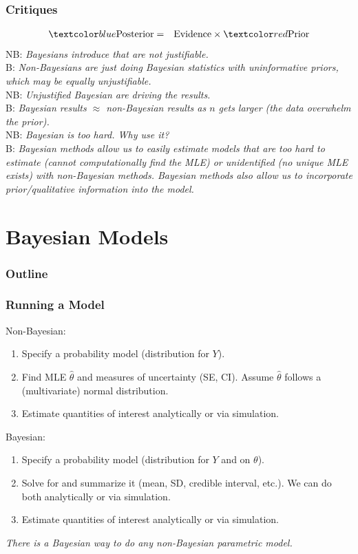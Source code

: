 \documentclass[handout]{beamer}
\begin{document}
\begin{frame}
\frametitle{Critiques}
\pause
\begin{eqnarray*}
\blue{\mathrm{Posterior}} &=& \mathrm{Evidence} \times \red{\mathrm{Prior}}
\end{eqnarray*}
\pause
NB: {\it Bayesians introduce  that are not justifiable.} \\
\pause
\footnotesize B: \emph{Non-Bayesians are just doing Bayesian statistics with uninformative
priors, which may be equally unjustifiable.} \\
\bigskip
\pause
\normalsize
NB: {\it Unjustified Bayesian  are driving the results.} \\
\pause
\footnotesize
B: \emph{Bayesian results $\approx$ non-Bayesian results as $n$ gets larger
(the data overwhelm the prior).} \\
\pause
\bigskip
\normalsize
NB: {\it Bayesian is too hard.  Why use it?} \\
\pause
\footnotesize
B: \emph{Bayesian methods allow us to easily estimate models that are too hard to
estimate (cannot computationally find the MLE) or unidentified (no unique MLE
exists) with non-Bayesian methods. \pause Bayesian methods also allow us to
incorporate prior/qualitative information into the model.}  
\normalsize
\end{frame}

\section{Bayesian Models}

\begin{frame}
\frametitle{Outline}
\tableofcontents[currentsection]
\end{frame}

\begin{frame}
\frametitle{Running a Model}
\pause
\begin{multicols}{2}
Non-Bayesian:
\pause
\begin{enumerate}
\item Specify a probability model (distribution for $Y$).
\pause
\item Find MLE $\hat{\theta}$ and measures of uncertainty (SE, CI).  Assume $\hat{\theta}$ follows a (multivariate) normal distribution.
\pause
\item Estimate quantities of interest analytically or via simulation.
\end{enumerate}
\newpage
\pause
Bayesian:
\begin{enumerate}
\item Specify a probability model (distribution for $Y$ and  on
$\theta$).
\pause
\item Solve for  and summarize it (mean, SD, credible
interval, etc.).  We can do both analytically or via simulation.
\pause
\item Estimate quantities of interest analytically or via simulation.
\end{enumerate}
\end{multicols}
\emph{There is a Bayesian way to do any non-Bayesian
parametric model.}
\end{frame}
\end{document}
